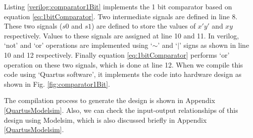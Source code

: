 \begin{explanation}
	Listing \ref{verilog:comparator1Bit} implements the 1 bit comparator based on equation \ref{eq:1bitComparator}. Two intermediate signals are defined in line 8. These two signals ($s0$ and $s1$) are defined to store the values of $x'y'$ and $xy$ respectively. Values to these signals are assigned at line 10 and 11. In verilog, `not' and `or' operations are implemented using `$\sim$' and `$|$' signs as shown in line 10 and 12 respectively. Finally equation \ref{eq:1bitComparator} performs `or' operation on these two signals, which is done at line 12. When we compile this code using `Quartus software', it implements the code into hardware design as shown in Fig. \ref{fig:comparator1Bit}.
	
	The compilation process to generate the design is shown in Appendix \ref{QuartusModelsim}. Also, we can check the input-output relationships of this design using Modelsim, which is also discussed briefly in Appendix \ref{QuartusModelsim}.   
\end{explanation}



